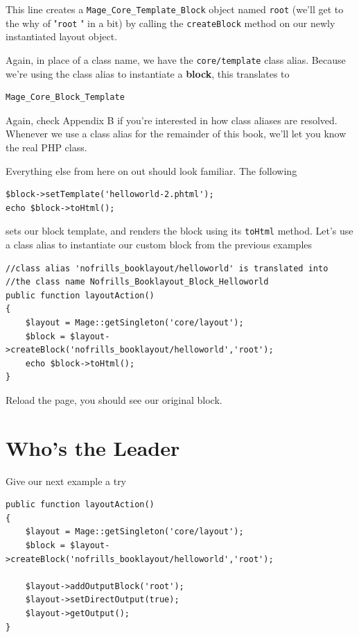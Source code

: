 \documentclass[oneside]{book}
\begin{document}
This line creates a \footnotesize\texttt{Mage\_Core\_Template\_Block} \normalsize  object named \footnotesize\texttt{root} \normalsize  (we'll get to the why of "\footnotesize\texttt{root} \normalsize " in a bit) by calling the \footnotesize\texttt{createBlock} \normalsize  method on our newly instantiated layout object.

Again, in place of a class name, we have the \footnotesize\texttt{core/template} \normalsize  class alias.  Because we're using the class alias to instantiate a \textbf{block}, this translates to

\begin{lstlisting}
Mage_Core_Block_Template

\end{lstlisting}


Again, check Appendix B if you're interested in how class aliases are resolved.  Whenever we use a class alias for the remainder of this book, we'll let you know the real PHP class.

Everything else from here on out should look familiar.  The following

\begin{lstlisting}
$block->setTemplate('helloworld-2.phtml');
echo $block->toHtml();

\end{lstlisting}


sets our block template, and renders the block using its \footnotesize\texttt{toHtml} \normalsize  method.  Let's use a class alias to instantiate our custom block from the previous examples

\begin{lstlisting}
//class alias 'nofrills_booklayout/helloworld' is translated into
//the class name Nofrills_Booklayout_Block_Helloworld
public function layoutAction()
{
    $layout = Mage::getSingleton('core/layout');
    $block = $layout->createBlock('nofrills_booklayout/helloworld','root');
    echo $block->toHtml();
}

\end{lstlisting}


Reload the page, you should see our original block.

\section{Who's the Leader}

Give our next example a try

\begin{lstlisting}
public function layoutAction()
{
    $layout = Mage::getSingleton('core/layout');
    $block = $layout->createBlock('nofrills_booklayout/helloworld','root');

    $layout->addOutputBlock('root');
    $layout->setDirectOutput(true);
    $layout->getOutput();
}

\end{lstlisting}
\end{document}
